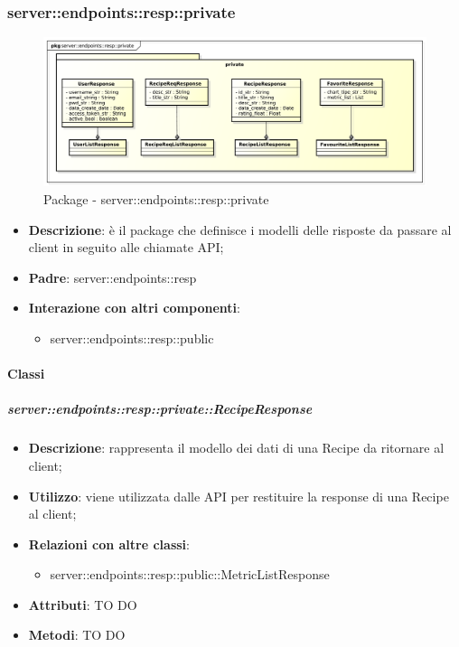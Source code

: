 \subsubsection{server::endpoints::resp::private} %
\label{ssub:bdsm_app_server_endpoints_resp_private}
\begin{figure}[!htbp]
	\centering
	\centerline{\includegraphics[scale=0.45]{./images/server/resp_private.pdf}}
	\caption{Package - server::endpoints::resp::private}
\end{figure}

\begin{itemize}
  \item \textbf{Descrizione}: è il package che definisce i modelli delle risposte da passare al client in seguito alle chiamate API;
  \item \textbf{Padre}: server::endpoints::resp
  \item \textbf{Interazione con altri componenti}:
  	\begin{itemize}
  		\item server::endpoints::resp::public
	\end{itemize}
\end{itemize}

	\paragraph{Classi} %

    \subparagraph{server::endpoints::resp::private::RecipeResponse} %
    \label{subp:bdsm_app_server_endpoints_resp_private_reciperesponse}
    \begin{itemize}
      \item \textbf{Descrizione}: rappresenta il modello dei dati di una Recipe da ritornare al client;
      \item \textbf{Utilizzo}: viene utilizzata dalle API per restituire la response di una Recipe al client;
      \item \textbf{Relazioni con altre classi}:
        \begin{itemize}
  			\item server::endpoints::resp::public::MetricListResponse
		\end{itemize}
	  \item \textbf{Attributi}: TO DO
	  \item \textbf{Metodi}: TO DO
      \end{itemize}

